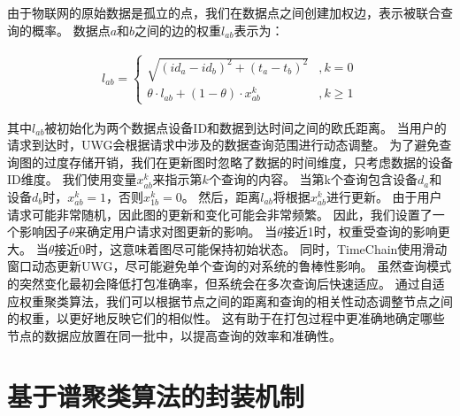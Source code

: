 由于物联网的原始数据是孤立的点，我们在数据点之间创建加权边，表示被联合查询的概率。
数据点$a$和$b$之间的边的权重$l_{ab}$表示为：

\begin{equation} 
    \label{eq:weight}
    \begin{split}
        l_{ab} =
        \begin{cases}
            \sqrt{ (id_a - id_b)^2 + (t_a - t_b)^2 } &, k = 0 \\  
            \theta \cdot l_{ab} + (1 - \theta) \cdot x_{ab}^k &, k \geq 1  
        \end{cases}
    \end{split}
\end{equation}

其中$l_{ab}$被初始化为两个数据点设备ID和数据到达时间之间的欧氏距离。
当用户的请求到达时，UWG会根据请求中涉及的数据查询范围进行动态调整。
为了避免查询图的过度存储开销，我们在更新图时忽略了数据的时间维度，只考虑数据的设备ID维度。
我们使用变量$x_{ab}^k$来指示第$k$个查询的内容。
当第k个查询包含设备$d_a$和设备$d_b$时，$x_{ab}^k=1$，否则$x_{1b}^k=0$。
然后，距离$l_{ab}$将根据$x_{ab}^k$进行更新。
由于用户请求可能非常随机，因此图的更新和变化可能会非常频繁。
因此，我们设置了一个影响因子$\theta$来确定用户请求对图更新的影响。
当$\theta$接近1时，权重受查询的影响更大。
当$\theta$接近0时，这意味着图尽可能保持初始状态。
同时，TimeChain使用滑动窗口动态更新UWG，尽可能避免单个查询的对系统的鲁棒性影响。
虽然查询模式的突然变化最初会降低打包准确率，但系统会在多次查询后快速适应。
通过自适应权重聚类算法，我们可以根据节点之间的距离和查询的相关性动态调整节点之间的权重，以更好地反映它们的相似性。
这有助于在打包过程中更准确地确定哪些节点的数据应放置在同一批中，以提高查询的效率和准确性。

\section{基于谱聚类算法的封装机制}
\label{sec:ratiocut}

